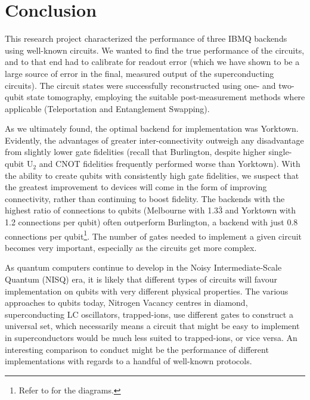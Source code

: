 \section{Conclusion}

This research project characterized the performance of three IBMQ backends using
well-known circuits. We wanted to find the true performance of the circuits, and
to that end had to calibrate for readout error (which we have shown to be a
large source of error in the final, measured output of the superconducting
circuits). The circuit states were successfully reconstructed using one- and
two-qubit state tomography, employing the suitable post-measurement methods
where applicable (Teleportation and Entanglement Swapping).

As we ultimately found, the optimal backend for implementation was Yorktown.
Evidently, the advantages of greater inter-connectivity outweigh any
disadvantage from slightly lower gate fidelities (recall that Burlington,
despite higher single-qubit U$_2$ and CNOT fidelities frequently performed worse
than Yorktown). With the ability to create qubits with consistently high gate
fidelities, we suspect that the greatest improvement to devices will come in the
form of improving connectivity, rather than continuing to boost fidelity. The
backends with the highest ratio of connections to qubits (Melbourne with
1.3$\bar{3}$ and Yorktown with 1.2 connections per qubit) often outperform
Burlington, a backend with just 0.8 connections per qubit\footnote{Refer to
   for the diagrams.}. The number of gates needed to
implement a given circuit becomes very important, especially as the circuits get
more complex.

As quantum computers continue to develop in the Noisy Intermediate-Scale Quantum
(NISQ) era, it is likely that different types of circuits will favour
implementation on qubits with very different physical properties. The various
approaches to qubits today, Nitrogen Vacancy centres in diamond, superconducting
LC oscillators, trapped-ions, use different gates to construct a universal set,
which necessarily means a circuit that might be easy to implement in
superconductors would be much less suited to trapped-ions, or vice versa. An
interesting comparison to conduct might be the performance of different
implementations with regards to a handful of well-known protocols.

